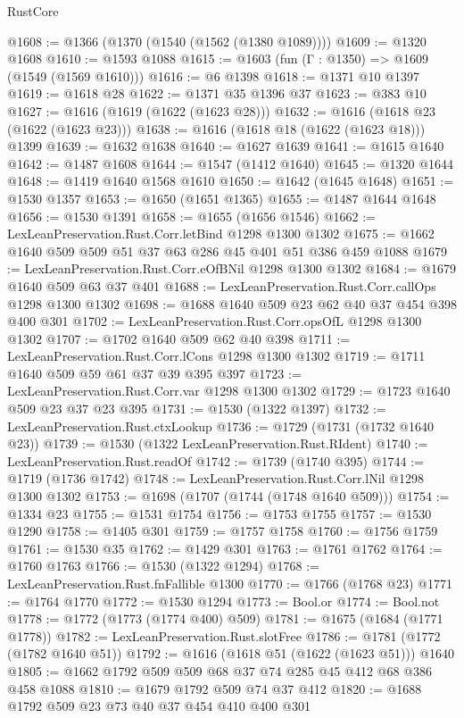 \begin{lexlean}{RustCore}
\begin{coremodule}
@1608 := @1366 (@1370 (@1540 (@1562 (@1380 @1089))))
@1609 := @1320 @1608
@1610 := @1593 @1088
@1615 := @1603 (fun (Γ : @1350) => @1609 (@1549 (@1569 @1610)))
@1616 := @6 @1398
@1618 := @1371 @10 @1397
@1619 := @1618 @28
@1622 := @1371 @35 @1396 @37
@1623 := @383 @10
@1627 := @1616 (@1619 (@1622 (@1623 @28)))
@1632 := @1616 (@1618 @23 (@1622 (@1623 @23)))
@1638 := @1616 (@1618 @18 (@1622 (@1623 @18))) @1399
@1639 := @1632 @1638
@1640 := @1627 @1639
@1641 := @1615 @1640
@1642 := @1487 @1608
@1644 := @1547 (@1412 @1640)
@1645 := @1320 @1644
@1648 := @1419 @1640 @1568 @1610
@1650 := @1642 (@1645 @1648)
@1651 := @1530 @1357
@1653 := @1650 (@1651 @1365)
@1655 := @1487 @1644 @1648
@1656 := @1530 @1391
@1658 := @1655 (@1656 @1546)
@1662 := LexLeanPreservation.Rust.Corr.letBind @1298 @1300 @1302
@1675 := @1662 @1640 @509 @509 @51 @37 @63 @286 @45 @401 @51 @386 @459 @1088
@1679 := LexLeanPreservation.Rust.Corr.eOfBNil @1298 @1300 @1302
@1684 := @1679 @1640 @509 @63 @37 @401
@1688 := LexLeanPreservation.Rust.Corr.callOps @1298 @1300 @1302
@1698 := @1688 @1640 @509 @23 @62 @40 @37 @454 @398 @400 @301
@1702 := LexLeanPreservation.Rust.Corr.opsOfL @1298 @1300 @1302
@1707 := @1702 @1640 @509 @62 @40 @398
@1711 := LexLeanPreservation.Rust.Corr.lCons @1298 @1300 @1302
@1719 := @1711 @1640 @509 @59 @61 @37 @39 @395 @397
@1723 := LexLeanPreservation.Rust.Corr.var @1298 @1300 @1302
@1729 := @1723 @1640 @509 @23 @37 @23 @395
@1731 := @1530 (@1322 @1397)
@1732 := LexLeanPreservation.Rust.ctxLookup
@1736 := @1729 (@1731 (@1732 @1640 @23))
@1739 := @1530 (@1322 LexLeanPreservation.Rust.RIdent)
@1740 := LexLeanPreservation.Rust.readOf
@1742 := @1739 (@1740 @395)
@1744 := @1719 (@1736 @1742)
@1748 := LexLeanPreservation.Rust.Corr.lNil @1298 @1300 @1302
@1753 := @1698 (@1707 (@1744 (@1748 @1640 @509)))
@1754 := @1334 @23
@1755 := @1531 @1754
@1756 := @1753 @1755
@1757 := @1530 @1290
@1758 := @1405 @301
@1759 := @1757 @1758
@1760 := @1756 @1759
@1761 := @1530 @35
@1762 := @1429 @301
@1763 := @1761 @1762
@1764 := @1760 @1763
@1766 := @1530 (@1322 @1294)
@1768 := LexLeanPreservation.Rust.fnFallible @1300
@1770 := @1766 (@1768 @23)
@1771 := @1764 @1770
@1772 := @1530 @1294
@1773 := Bool.or
@1774 := Bool.not
@1778 := @1772 (@1773 (@1774 @400) @509)
@1781 := @1675 (@1684 (@1771 @1778))
@1782 := LexLeanPreservation.Rust.slotFree
@1786 := @1781 (@1772 (@1782 @1640 @51))
@1792 := @1616 (@1618 @51 (@1622 (@1623 @51))) @1640
@1805 := @1662 @1792 @509 @509 @68 @37 @74 @285 @45 @412 @68 @386 @458 @1088
@1810 := @1679 @1792 @509 @74 @37 @412
@1820 := @1688 @1792 @509 @23 @73 @40 @37 @454 @410 @400 @301

\end{coremodule}
\end{lexlean}
